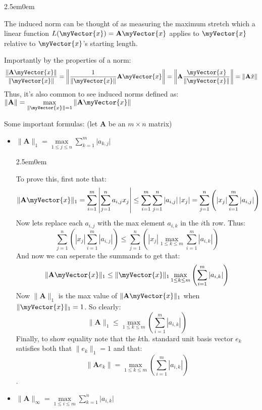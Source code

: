 \documentclass{book}
\newcommand{\hTwo}{%
   \color{MidnightBlue}%
   \fontsize{13}{15}\selectfont%
}
\newcommand{\hFour}{%
   \color{Cerulean}
   \fontsize{12}{14}\selectfont%
}
\newenvironment{myIndent}{%
   \begin{adjustwidth}{2.5em}{0em}%
}{%
   \end{adjustwidth}%
}
\newcommand{\retTwo}{\hfill\bigbreak}
\newcommand{\mVec}[1]{\myVector{#1}}
\newcommand{\mMat}[1]{\mathbf{#1}}
\begin{document}
   {\begin{myIndent} \hTwo
      The induced norm can be thought of as measuring the maximum stretch which a linear function $L(\mVec{x}) = \mMat{A}\mVec{x}$ applies to $\mVec{x}$ relative to $\mVec{x}$'s starting length. \retTwo

      Importantly by the properties of a norm:
      \[\frac{\|\mMat{A}\mVec{x}\|}{\|\mVec{x}\|} = \left\|\frac{1}{\|\mVec{x}\|}\mMat{A}\mVec{x}\right\| = \left\|\mMat{A}\frac{\mVec{x}}{\|\mVec{x}\|}\right\| = \left\|\mMat{A}\hat{x}\right\|\]
      Thus, it's also common to see induced norms defined as: $\|\mMat{A}\| = \max\limits_{\|\mVec{x}\| = 1}{\|\mMat{A}\mVec{x}\|}$
      \retTwo

      Some important formulas: (let $\mMat{A}$ be an $m \times n$ matrix)
      \begin{itemize}
         \item $\|\mMat{A}\|_1 = \max\limits_{1\leq j \leq n}{{\displaystyle \sum_{k=1}^m{\lvert a_{k,j} \rvert}}}$ \retTwo
         
         {\begin{myIndent} \hFour
            To prove this, first note that: \[\|\mMat{A}\mVec{x}\|_1 = \sum_{i=1}^m{\left|\sum_{j=1}^n{a_{i,j}x_j}\right|} \leq \sum_{i=1}^m{\sum_{j=1}^n{\left|a_{i,j}\right|\left|x_j\right|}} = \sum_{j=1}^n{\left(\left|x_j\right|\sum_{i=1}^m{\left|a_{i,j}\right|}\right)}\]
            Now lets replace each $a_{i,j}$ with the max element $a_{i,k}$ in the $i$th row. Thus: \[\sum_{j=1}^n{\left(\left|x_j\right|\sum_{i=1}^m{\left|a_{i,j}\right|}\right)} \leq \sum_{j=1}^n{\left(\left|x_j\right|\max\limits_{1\leq k \leq m}{
            \sum_{i=1}^m{\left|a_{i,k}\right|}}\right)}\]
            And now we can seperate the summands to get that: \[\|\mMat{A}\mVec{x}\|_1 \leq \|\mVec{x}\|_1\max\limits_{1\leq k \leq m}{\left(\sum_{i=1}^m{\left|a_{i,k}\right|}\right)}\]
            Now $\|\mMat{A}\|_1$ is the max value of $\|\mMat{A}\mVec{x}\|_1$ when $\|\mVec{x}\|_1 = 1$. So clearly: \[\|\mMat{A}\|_1 \leq{\displaystyle\max\limits_{1\leq k \leq m}{\left(\sum_{i=1}^m{\left|a_{i,k}\right|}\right)}}\]
            Finally, to show equality note that the $k$th. standard unit basis vector $e_k$ satisfies both that $\|e_k\|_1 = 1$ and that:
            \[\|\mMat{A}e_k\| = \max\limits_{1\leq k \leq m}{\left(\sum_{i=1}^m{\left|a_{i,k}\right|}\right)}\]. \retTwo
         \end{myIndent}}

         \item $\|\mMat{A}\|_\infty = \max\limits_{1\leq i \leq m}{{\displaystyle \sum_{k=1}^n{\lvert a_{i,k} \rvert}}}$ \retTwo
         

\end{itemize}
\end{myIndent}}
\end{document}
